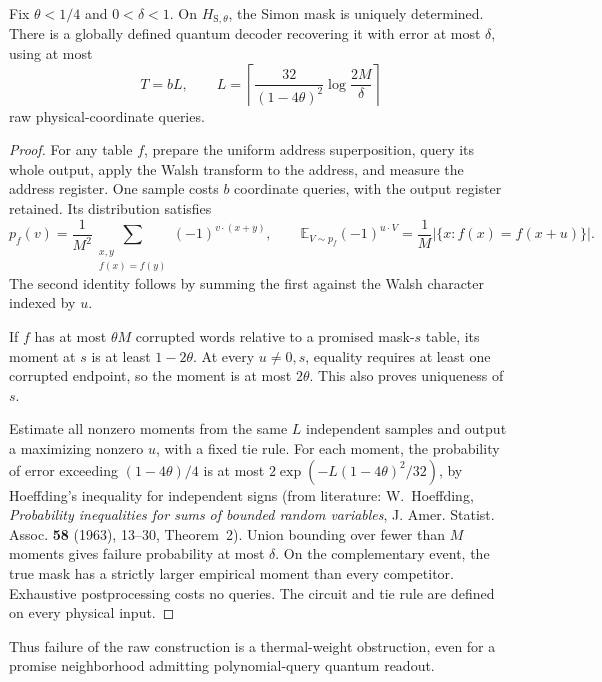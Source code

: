 \begin{lemma}
\label{ian:thermal-simon-word-decoder}
Fix \(\theta<1/4\) and \(0<\delta<1\). On
\(H_{\mathrm S,\theta}\), the Simon mask is uniquely determined.
There is a globally defined quantum decoder recovering it with error
at most \(\delta\), using at most
\[
 T=bL,\qquad
 L=\left\lceil
 \frac{32}{(1-4\theta)^2}\log\frac{2M}{\delta}
 \right\rceil
 \tag{36.8}
\]
raw physical-coordinate queries.
\end{lemma}

\begin{proof}
For any table \(f\), prepare the uniform address superposition,
query its whole output, apply the Walsh transform to the address,
and measure the address register. One sample costs \(b\) coordinate
queries, with the output register retained. Its distribution satisfies
\[
 p_f(v)=\frac1{M^2}
 \sum_{\substack{x,y\\f(x)=f(y)}}(-1)^{v\cdot(x+y)},
 \qquad
 \mathbb E_{V\sim p_f}(-1)^{u\cdot V}
 =\frac1M|\{x:f(x)=f(x+u)\}|.
 \tag{36.9}
\]
The second identity follows by summing the first against the Walsh
character indexed by \(u\).

If \(f\) has at most \(\theta M\) corrupted words relative to a
promised mask-\(s\) table, its moment at \(s\) is at least
\(1-2\theta\). At every \(u\ne0,s\), equality requires at least one
corrupted endpoint, so the moment is at most \(2\theta\).
This also proves uniqueness of \(s\).

Estimate all nonzero moments from the same \(L\) independent samples
and output a maximizing nonzero \(u\), with a fixed tie rule.
For each moment, the probability of error exceeding
\((1-4\theta)/4\) is at most
\(2\exp(-L(1-4\theta)^2/32)\), by Hoeffding's inequality for
independent signs (from literature: W.~Hoeffding, \emph{Probability
inequalities for sums of bounded random variables}, J. Amer. Statist.
Assoc. \textbf{58} (1963), 13--30, Theorem~2). Union bounding over
fewer than \(M\) moments gives
failure probability at most \(\delta\). On the complementary event,
the true mask has a strictly larger empirical moment than every
competitor. Exhaustive postprocessing costs no queries.
The circuit and tie rule are defined on every physical input.
\end{proof}

Thus failure of the raw construction is a thermal-weight obstruction,
even for a promise neighborhood admitting polynomial-query quantum
readout.

